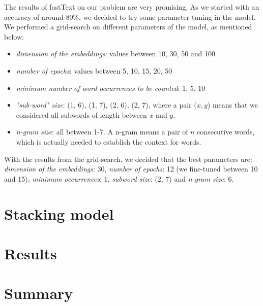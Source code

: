 \documentclass[10pt,conference,compsocconf]{IEEEtran}
\begin{document}
The results of fastText on our problem are very promising. As we started with an accuracy of around 80\%, we decided to try some parameter tuning in the model. We performed a grid-search on different parameters of the model, as mentioned below:

\begin{itemize}
	\item \textit{dimension of the embeddings}: values between 10, 30, 50 and 100
	\item \textit{number of epochs}: values between 5, 10, 15, 20, 50
	\item \textit{minimum number of word occurrences to be counted}: 1, 5, 10
	\item \textit{"sub-word" size}: (1, 6), (1, 7), (2, 6), (2, 7), where a pair ($x, y$) means that we considered all subwords of length between $x$ and $y$.
	
	\item \textit{n-gram size}: all between 1-7. A n-gram means a pair of $n$ consecutive words, which is actually needed to establish the context for words.  
\end{itemize}

With the results from the grid-search, we decided that the best parameters are: \textit{dimension of the embeddings}: 30, \textit{number of epochs}: 12 (we fine-tuned between 10 and 15), \textit{minimum occurrences}; 1, \textit{subword size}: (2, 7) and \textit{n-gram size}: 6.

\section{Stacking model}
\section{Results}

\section{Summary}


\end{document}
